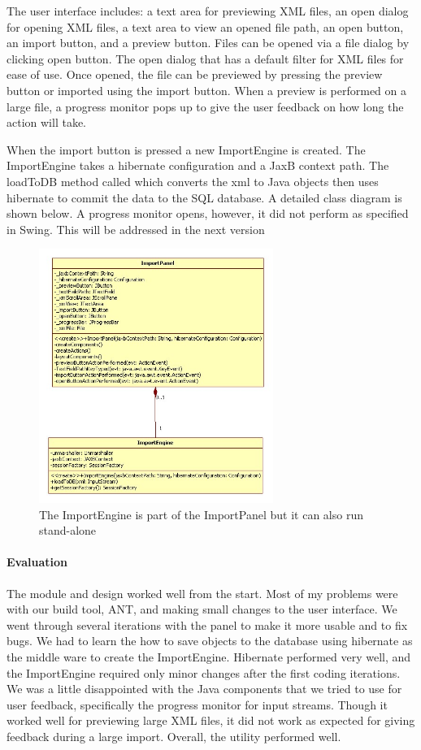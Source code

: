 \par
The user interface includes: a text area for previewing XML files, an open dialog for opening XML files, a text area to view an opened file path, an open button, an import button, and a preview button. Files can be opened via a file dialog by clicking open button. The open dialog that has a default filter for XML files for ease of use. Once opened, the file can be previewed by pressing the preview button or imported using the import button. When a preview is performed on a large file, a progress monitor pops up to give the user feedback on how long the action will take. 
\par	
When the import button is pressed a new ImportEngine is created. The ImportEngine takes a hibernate configuration and a JaxB context path. The loadToDB method called which converts the xml to Java objects then uses hibernate to commit the data to the SQL database. A detailed class diagram is shown below. A progress monitor opens, however, it did not perform as specified in Swing. This will be addressed in the next version

\begin{figure}[h]
	\centering
		\includegraphics[width=3.00in]{Images/ImportClasses.jpg}
	\caption{The ImportEngine is part of the ImportPanel but it can also run stand-alone}
	\label{fig:ImportClasses}
\end{figure}

\paragraph{Evaluation}
The module and design worked well from the start. Most of my problems were with our build tool, ANT, and making small changes to the user interface. We went through several iterations with the panel to make it more usable and to fix bugs. We had to learn the how to save objects to the database using hibernate as the middle ware to create the ImportEngine. Hibernate performed very well, and the ImportEngine required only minor changes after the first coding iterations. We was a little disappointed with the Java components that we tried to use for user feedback, specifically the progress monitor for input streams. Though it worked well for previewing large XML files, it did not work as expected for giving feedback during a large import. Overall, the utility performed well. 

